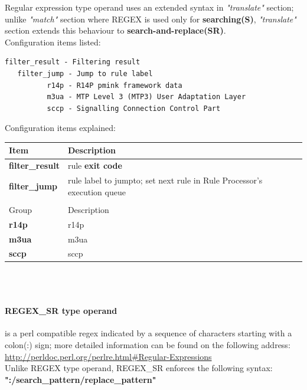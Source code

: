 \documentclass[a4paper,latin]{paper}
\begin{document}
Regular expression type operand uses an extended syntax in \textit{"translate"} section; unlike \textit{"match"} section where REGEX is used only for \textbf{searching(S)}, \textit{"translate"} section 
extends this behaviour to \textbf{search-and-replace(SR)}.\\

\noindent{}Configuration items listed:
\begin{lstlisting}[style=BashInputStyle, belowskip=\baselineskip, upquote=true]
 filter_result - Filtering result
   filter_jump - Jump to rule label
          r14p - R14P pmink framework data
          m3ua - MTP Level 3 (MTP3) User Adaptation Layer
          sccp - Signalling Connection Control Part
\end{lstlisting}

\noindent{}Configuration items explained:\\
\begin{tabularx}{\textwidth}{ | l | X | }
	\hline
	Item	 		& Description \\
	\hline
	\textbf{filter\_result}	& \Gls{rule} \textbf{exit code}\footnotemark \\
	\textbf{filter\_jump}	& \Gls{rule} label to jump\footnotemark[\value{footnote}] to; set next rule in Rule Processor's execution queue \\
	\hline
				& \\
	\hline
	Group			& Description \\
	\hline
	\textbf{r14p}		& \acrfull{r14p} \\
	\textbf{m3ua}		& \acrfull{m3ua} \\
	\textbf{sccp}		& \acrfull{sccp} \\ 
	\hline
\end{tabularx}\\\\

\paragraph{REGEX\_SR type operand}
is a \Gls{perl} compatible \Gls{regex} indicated by a sequence of characters starting with a colon(:) sign; more detailed information can be found on the following address: \url{http://perldoc.perl.org/perlre.html\#Regular-Expressions}\\

\noindent{}Unlike REGEX type operand, REGEX\_SR enforces the following syntax: \textbf{":/search\_pattern/replace\_pattern"}\\
\end{document}
